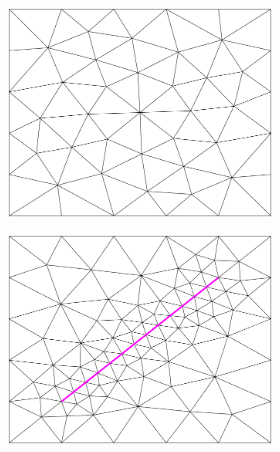 \begin{figure}[p]
    \centering
    \begin{subfigure}[b]{\textwidth}
        \centering
        \begin{subfigure}[b]{0.33\textwidth}
            \centering
            \includegraphics[width=\textwidth]{report/Images/Software/Gmsh meshing algorithms/gmsh_meshing_algorithms_meshadapt.png}
        \end{subfigure}
        \begin{subfigure}[b]{0.33\textwidth}
            \centering
            \includegraphics[width=\textwidth]{report/Images/Software/Gmsh meshing algorithms/gmsh_meshing_algorithms_embedded_meshadapt.png}

\end{subfigure}
\end{subfigure}
\end{figure}
